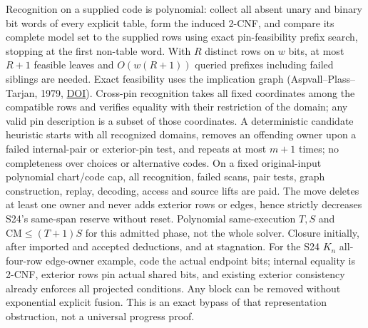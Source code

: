 \documentclass[11pt]{article}
\begin{document}
Recognition on a supplied code is polynomial: collect all absent unary and binary bit words of every explicit table, form the induced 2-CNF, and compare its complete model set to the supplied rows using exact pin-feasibility prefix search, stopping at the first non-table word. With $R$ distinct rows on $w$ bits, at most $R+1$ feasible leaves and $O(w(R+1))$ queried prefixes including failed siblings are needed. Exact feasibility uses the implication graph (Aspvall--Plass--Tarjan, 1979, \href{https://doi.org/10.1016/0020-0190(79)90002-4}{DOI}). Cross-pin recognition takes all fixed coordinates among the compatible rows and verifies equality with their restriction of the domain; any valid pin description is a subset of those coordinates. A deterministic candidate heuristic starts with all recognized domains, removes an offending owner upon a failed internal-pair or exterior-pin test, and repeats at most $m+1$ times; no completeness over choices or alternative codes. On a fixed original-input polynomial chart/code cap, all recognition, failed scans, pair tests, graph construction, replay, decoding, access and source lifts are paid. The move deletes at least one owner and never adds exterior rows or edges, hence strictly decreases S24's same-span reserve without reset. Polynomial same-execution $T,S$ and $\mathrm{CM}\le(T+1)S$ for this admitted phase, not the whole solver. Closure initially, after imported and accepted deductions, and at stagnation. For the S24 $K_n$ all-four-row edge-owner example, code the actual endpoint bits; internal equality is 2-CNF, exterior rows pin actual shared bits, and existing exterior consistency already enforces all projected conditions. Any block can be removed without exponential explicit fusion. This is an exact bypass of that representation obstruction, not a universal progress proof.
\end{document}
